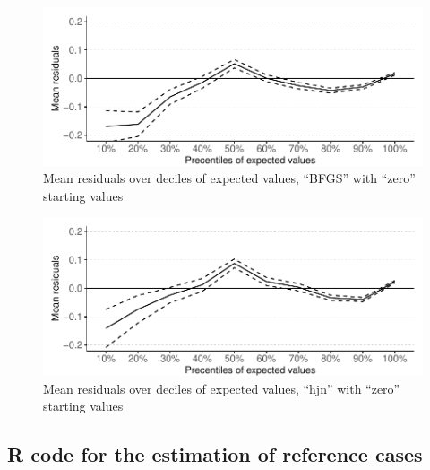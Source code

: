 \documentclass[
]{article}
\begin{document}
\begin{figure}
\centering
\includegraphics{aldvmm_vignette_files/figure-latex/plot-comp-mhl2-1.pdf}
\caption{\label{fig:plot-comp-mhl2}Mean residuals over deciles of expected values, ``BFGS'' with ``zero'' starting values}
\end{figure}

\begin{figure}
\centering
\includegraphics{aldvmm_vignette_files/figure-latex/plot-comp-mhl3-1.pdf}
\caption{\label{fig:plot-comp-mhl3}Mean residuals over deciles of expected values, ``hjn'' with ``zero'' starting values}
\end{figure}

\newpage

\hypertarget{r-code-for-the-estimation-of-reference-cases}{%
\subsection{R code for the estimation of reference cases}\label{r-code-for-the-estimation-of-reference-cases}}
\end{document}
